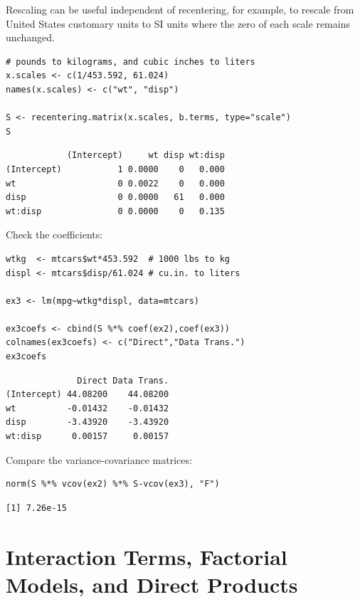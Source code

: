 \documentclass[]{article}
\begin{document}
Rescaling can be useful independent of recentering, for example, to
rescale from United States customary units to SI units where the zero of
each scale remains unchanged.

\begin{verbatim}
# pounds to kilograms, and cubic inches to liters
x.scales <- c(1/453.592, 61.024)
names(x.scales) <- c("wt", "disp")
  
S <- recentering.matrix(x.scales, b.terms, type="scale")
S
\end{verbatim}

\begin{verbatim}
            (Intercept)     wt disp wt:disp
(Intercept)           1 0.0000    0   0.000
wt                    0 0.0022    0   0.000
disp                  0 0.0000   61   0.000
wt:disp               0 0.0000    0   0.135
\end{verbatim}

Check the coefficients:

\begin{verbatim}
wtkg  <- mtcars$wt*453.592  # 1000 lbs to kg
displ <- mtcars$disp/61.024 # cu.in. to liters

ex3 <- lm(mpg~wtkg*displ, data=mtcars)

ex3coefs <- cbind(S %*% coef(ex2),coef(ex3))
colnames(ex3coefs) <- c("Direct","Data Trans.")
ex3coefs
\end{verbatim}

\begin{verbatim}
              Direct Data Trans.
(Intercept) 44.08200    44.08200
wt          -0.01432    -0.01432
disp        -3.43920    -3.43920
wt:disp      0.00157     0.00157
\end{verbatim}

Compare the variance-covariance matrices:

\begin{verbatim}
norm(S %*% vcov(ex2) %*% S-vcov(ex3), "F")
\end{verbatim}

\begin{verbatim}
[1] 7.26e-15
\end{verbatim}

\hypertarget{interaction-terms-factorial-models-and-direct-products}{%
\section{Interaction Terms, Factorial Models, and Direct
Products}\label{interaction-terms-factorial-models-and-direct-products}}
\end{document}
